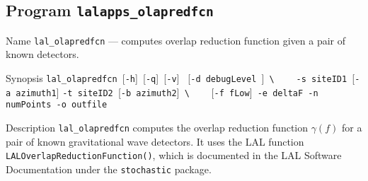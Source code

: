 \subsection{Program \texttt{lalapps\_olapredfcn}}
\label{program:lalapps-olapredfcn}

\begin{entry}

\item[Name]
%
  \verb$lal_olapredfcn$ --- computes overlap reduction function given
  a pair of known detectors.

\item[Synopsis]
%
  \verb$lal_olapredfcn $[\verb$-h$]\verb$ $[\verb$-q$]\verb$ $[\verb$-v$]
  \verb$ $[\verb$-d debugLevel $]\verb+ \+\newline
  \verb$   $
  \verb$-s siteID1 $[\verb$-a azimuth1$]
  \verb$-t siteID2 $[\verb$-b azimuth2$]\verb+ \+\newline
  \verb$   $
  [\verb$-f fLow$]\verb$ -e deltaF$\verb$ -n numPoints$\verb$ -o outfile$
                         
\item[Description]
%
  \verb$lal_olapredfcn$ computes the overlap reduction function
  $\gamma(f)$ for a pair of known gravitational wave detectors.  It
  uses the LAL function \verb$LALOverlapReductionFunction()$, which is
  documented in the LAL Software Documentation under the
  \texttt{stochastic} package.


\end{entry}
